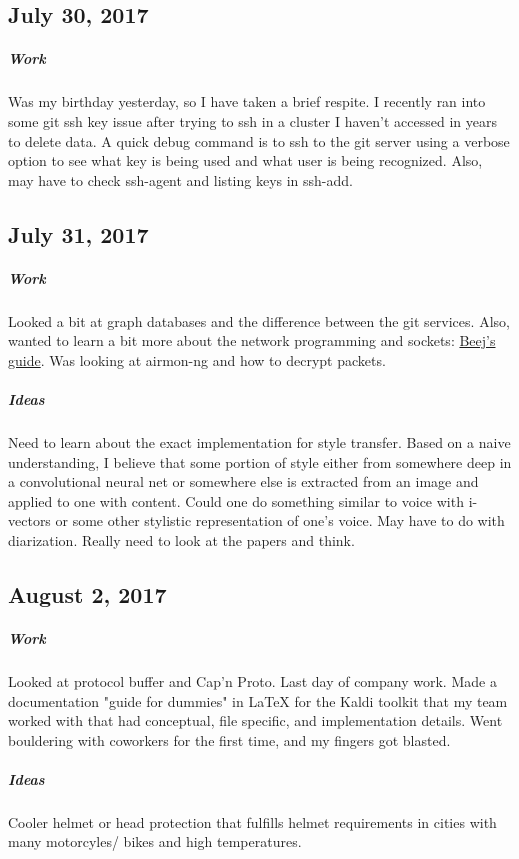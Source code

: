 \documentclass[a4paper]{article}
\begin{document}
\subsection{July 30, 2017}
\subparagraph{Work}
Was my birthday yesterday, so I have taken a brief respite. I recently ran into some git ssh key issue after trying to ssh in a cluster I haven't accessed in years to delete data. A quick debug command is to ssh to the git server using a verbose option to see what key is being used and what user is being recognized. Also, may have to check ssh-agent and listing keys in ssh-add.

\subsection{July 31, 2017}
\subparagraph{Work}
Looked a bit at graph databases and the difference between the git services. Also, wanted to learn a bit more about the network programming and sockets: \href{http://beej.us/guide/bgnet/}{Beej's guide}. Was looking at airmon-ng and how to decrypt packets.
\subparagraph{Ideas}
Need to learn about the exact implementation for style transfer. Based on a naive understanding, I believe that some portion of style either from somewhere deep in a convolutional neural net or somewhere else is extracted from an image and applied to one with content. Could one do something similar to voice with i-vectors or some other stylistic representation of one's voice. May have to do with diarization. Really need to look at the papers and think. 

\subsection{August 2, 2017}
\subparagraph{Work}
Looked at protocol buffer and Cap'n Proto. Last day of company work. Made a documentation "guide for dummies" in LaTeX for the Kaldi toolkit that my team worked with that had conceptual, file specific, and implementation details. Went bouldering with coworkers for the first time, and my fingers got blasted.
\subparagraph{Ideas}
Cooler helmet or head protection that fulfills helmet requirements in cities with many motorcyles/ bikes and high temperatures.
\end{document}
